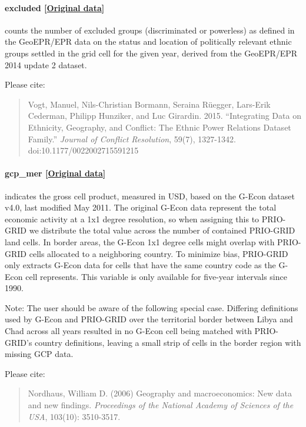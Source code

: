 \documentclass[]{book}
\begin{document}
\paragraph{excluded
{[}\href{http://www.icr.ethz.ch/data/geoepr}{Original
data}{]}}\label{excluded}

counts the number of excluded groups (discriminated or powerless) as
defined in the GeoEPR/EPR data on the status and location of politically
relevant ethnic groups settled in the grid cell for the given year,
derived from the GeoEPR/EPR 2014 update 2 dataset.

Please cite:

\begin{quote}
Vogt, Manuel, Nils-Christian Bormann, Seraina Rüegger, Lars-Erik
Cederman, Philipp Hunziker, and Luc Girardin. 2015. ``Integrating Data
on Ethnicity, Geography, and Conflict: The Ethnic Power Relations
Dataset Family.'' \emph{Journal of Conflict Resolution}, 59(7),
1327-1342. doi:10.1177/0022002715591215
\end{quote}

\paragraph{gcp\_mer {[}\href{http://gecon.yale.edu/}{Original
data}{]}}\label{gcp-mer}

indicates the gross cell product, measured in USD, based on the G-Econ
dataset v4.0, last modified May 2011. The original G-Econ data represent
the total economic activity at a 1x1 degree resolution, so when
assigning this to PRIO-GRID we distribute the total value across the
number of contained PRIO-GRID land cells. In border areas, the G-Econ
1x1 degree cells might overlap with PRIO-GRID cells allocated to a
neighboring country. To minimize bias, PRIO-GRID only extracts G-Econ
data for cells that have the same country code as the G-Econ cell
represents. This variable is only available for five-year intervals
since 1990.

Note: The user should be aware of the following special case. Differing
definitions used by G-Econ and PRIO-GRID over the territorial border
between Libya and Chad across all years resulted in no G-Econ cell being
matched with PRIO-GRID's country definitions, leaving a small strip of
cells in the border region with missing GCP data.

Please cite:

\begin{quote}
Nordhaus, William D. (2006) Geography and macroeconomics: New data and
new findings. \emph{Proceedings of the National Academy of Sciences of
the USA}, 103(10): 3510-3517.
\end{quote}
\end{document}
